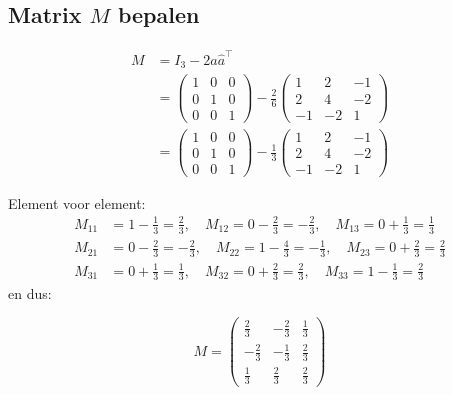 \documentclass{article}
\begin{document}
\subsection*{Matrix $M$ bepalen}

\begin{align*}
    M & = I_3 - 2\hat{a}\hat{a}^{\top}                                      \\
      & = \begin{pmatrix} 1 & 0 & 0 \\ 0 & 1 & 0 \\ 0 & 0 & 1 \end{pmatrix}
    - \frac{2}{6} \begin{pmatrix}
                      1  & 2  & -1 \\
                      2  & 4  & -2 \\
                      -1 & -2 & 1
                  \end{pmatrix}                                            \\
      & = \begin{pmatrix} 1 & 0 & 0 \\ 0 & 1 & 0 \\ 0 & 0 & 1 \end{pmatrix}
    - \frac{1}{3} \begin{pmatrix}
                      1  & 2  & -1 \\
                      2  & 4  & -2 \\
                      -1 & -2 & 1
                  \end{pmatrix}
\end{align*}

Element voor element:
\begin{align*}
    M_{11} & = 1 - \frac{1}{3} = \frac{2}{3}, \quad M_{12} = 0 - \frac{2}{3} = -\frac{2}{3}, \quad M_{13} = 0 + \frac{1}{3} = \frac{1}{3}  \\
    M_{21} & = 0 - \frac{2}{3} = -\frac{2}{3}, \quad M_{22} = 1 - \frac{4}{3} = -\frac{1}{3}, \quad M_{23} = 0 + \frac{2}{3} = \frac{2}{3} \\
    M_{31} & = 0 + \frac{1}{3} = \frac{1}{3}, \quad M_{32} = 0 + \frac{2}{3} = \frac{2}{3}, \quad M_{33} = 1 - \frac{1}{3} = \frac{2}{3}
\end{align*}
en dus:

\[ \boxed{M = \begin{pmatrix}
            \frac{2}{3}  & -\frac{2}{3} & \frac{1}{3} \\[0.3em]
            -\frac{2}{3} & -\frac{1}{3} & \frac{2}{3} \\[0.3em]
            \frac{1}{3}  & \frac{2}{3}  & \frac{2}{3}
        \end{pmatrix}} \]
\end{document}
